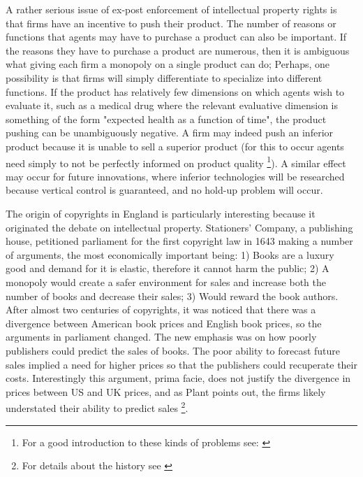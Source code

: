 \documentclass[12pt]{report}
\numberwithin{equation}{section}
\begin{document}
A rather serious issue of ex-post enforcement of intellectual property rights is that firms have an incentive to push their product. The number of reasons or functions that agents may have to purchase a product can also be important. If the reasons they have to purchase a product are numerous, then it is ambiguous what giving each firm a monopoly on a single product can do; Perhaps, one possibility is that firms will simply differentiate to specialize into different functions. If the product has relatively few dimensions on which agents wish to evaluate it, such as a medical drug where the relevant evaluative dimension is something of the form "expected health as a function of time", the product pushing can be unambiguously negative. A firm may indeed push an inferior product because it is unable to sell a superior product (for this to occur agents need simply to not be perfectly informed on product quality \footnote{For a good introduction to these kinds of problems see: \cite{spiegler2011bounded} }). A similar effect may occur for future innovations, where inferior technologies will be researched because vertical control is guaranteed, and no hold-up problem will occur.

The origin of copyrights in England is particularly interesting because it originated the debate on intellectual property. Stationers' Company, a publishing house, petitioned parliament for the first copyright law in 1643 making a number of arguments, the most economically important being: 1) Books are a luxury good and demand for it is elastic, therefore it cannot harm the public; 2) A monopoly would create a safer environment for sales and increase both the number of books and decrease their sales; 3) Would reward the book authors. After almost two centuries of copyrights, it was noticed that there was a divergence between American book prices and English book prices, so the arguments in parliament changed. The new emphasis was on how poorly publishers could predict the sales of books. The poor ability to forecast future sales implied a need for higher prices so that the publishers could recuperate their costs. Interestingly this argument, prima facie, does  not justify the divergence in prices between US and UK prices, and as Plant points out, the firms likely understated their ability to predict sales \footnote{For details about the history see \cite{Plant1934}}.
\end{document}
